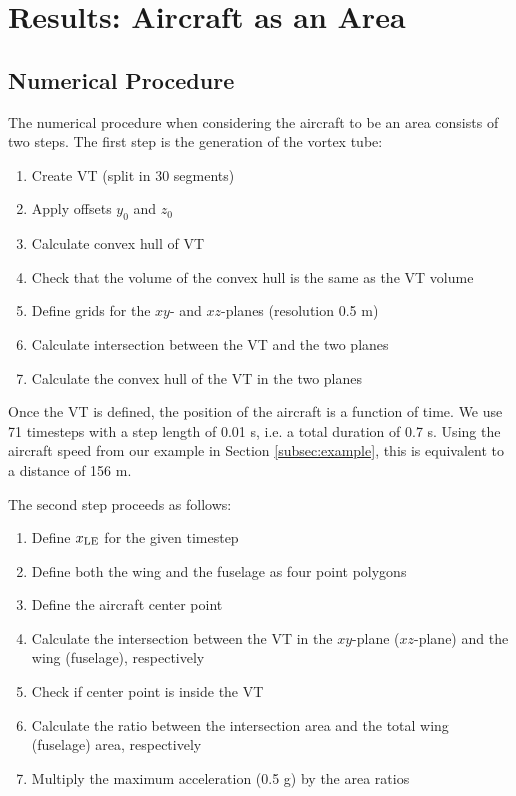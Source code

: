 \documentclass[smallextended]{svjour3}       %
\begin{document}
\section{Results: Aircraft as an Area}

\subsection{Numerical Procedure}

The numerical procedure when considering the aircraft to be an area consists of two steps. The first step is the generation of the vortex tube:

\begin{enumerate}
\item Create VT (split in 30 segments)
\item Apply offsets $y_0$ and $z_0$
\item Calculate convex hull of VT
\item Check that the volume of the convex hull is the same as the VT volume
\item Define grids for the $xy$- and $xz$-planes (resolution 0.5 m)
\item Calculate intersection between the VT and the two planes
\item Calculate the convex hull of the VT in the two planes
\end{enumerate}

Once the VT is defined, the position of the aircraft is a function of time. We use 71 timesteps with a step length of 0.01 s, i.e. a total duration of 0.7 s. Using the aircraft speed from our example in Section \ref{subsec:example}, this is equivalent to a distance of 156 m.

The second step proceeds as follows:

\begin{enumerate}
\item Define $x_{\rm LE}$ for the given timestep
\item Define both the wing and the fuselage as four point polygons
\item Define the aircraft center point
\item Calculate the intersection between the VT in the $xy$-plane ($xz$-plane) and the wing (fuselage), respectively
\item Check if center point is inside the VT
\item Calculate the ratio between the intersection area and the total wing (fuselage) area, respectively
\item Multiply the maximum acceleration (0.5 g) by the area ratios
\end{enumerate}
\end{document}

